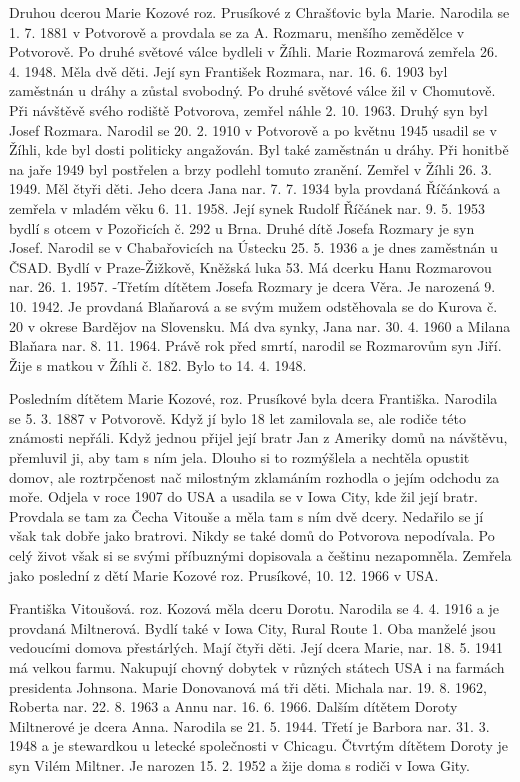 \documentclass[../dejiny-rodu-prusiku.tex]{subfiles}
\begin{document}
Druhou dcerou Marie Kozové roz. Prusíkové z Chrašťovic byla Marie. Narodila se 1. 7. 1881 v Potvorově a provda­la se za A. Rozmaru, menšího zemědělce v Potvorově. Po druhé světové válce bydleli v Žíhli. Marie Rozmarová zemřela 26. 4. 1948. Měla dvě děti. Její syn František Rozmara, nar. 16. 6. 1903 byl zaměstnán u dráhy a zůstal svobodný. Po druhé světové válce žil v Chomutově. Při návštěvě svého rodiště Potvorova, zemřel náhle 2. 10. 1963. Druhý syn byl Josef Rozmara. Narodil se 20. 2. 1910 v Potvorově a po květnu 1945 usadil se v Žíhli, kde byl dosti politicky angažován. Byl také zaměstnán u dráhy. Při honitbě na jaře 1949 byl postřelen a brzy podlehl tomuto zranění. Zemřel v Žíhli 26. 3. 1949. Měl čtyři děti. Jeho dcera Jana nar. 7. 7. 1934 byla provdaná Říčánková a zemřela v mladém věku 6. 11. 1958. Její synek Rudolf Říčánek nar. 9. 5. 1953 bydlí s otcem v Pozořicích č. 292 u Brna. Druhé dítě Josefa Rozmary je syn Josef. Narodil se v Chabařovicích na Ústecku 25. 5. 1936 a je dnes zaměstnán u ČSAD. Bydlí v Praze-Žižkově, Kněžská luka 53. Má dcerku Hanu Rozmarovou nar. 26. 1. 1957. -Třetím dítětem Josefa Rozmary je dcera Věra. Je narozená 9. 10. 1942. Je provdaná Blaňarová a se svým mužem odstěhovala se do Kurova č. 20 v okrese Bardějov na Slovensku. Má dva synky, Jana nar. 30. 4. 1960 a Milana Blaňara nar. 8. 11. 1964. Právě rok před smrtí, narodil se Rozmarovům syn Jiří. Žije s matkou v Žíhli č. 182. Bylo to 14. 4. 1948.

Posledním dítětem Marie Kozové, roz. Prusíkové byla dcera Františka. Narodila se 5. 3. 1887 v Potvorově. Když jí bylo 18 let zamilovala se, ale rodiče této známosti nepřáli. Když jednou přijel její bratr Jan z Ameriky domů na návštěvu, přemluvil ji, aby tam s ním jela. Dlouho si to rozmýšlela a nechtěla opustit domov, ale roztrpčenost nač milostným zklamáním roz­hodla o jejím odchodu za moře. Odjela v roce 1907 do USA a usadila se v Iowa City, kde žil její bratr. Provdala se tam za Čecha Vitouše a měla tam s ním dvě dcery. Nedařilo se jí však tak dobře jako bratrovi. Nikdy se také domů do Potvorova nepodívala. Po celý život však si se svými příbuznými dopisovala a češti­nu nezapomněla. Zemřela jako poslední z dětí Marie Kozové roz. Prusíkové, 10. 12. 1966 v USA.

Františka Vitoušová. roz. Kozová měla dceru Dorotu. Narodila se 4. 4. 1916 a je provdaná Miltnerová. Bydlí také v Iowa City, Rural Route 1. Oba manželé jsou vedoucími domova přestárlých. Mají čtyři děti. Její dcera Marie, nar. 18. 5. 1941 má velkou farmu. Nakupují chovný dobytek v různých státech USA i na farmách pre­sidenta Johnsona. Marie Donovanová má tři děti. Michala nar. 19. 8. 1962, Roberta nar. 22. 8. 1963 a Annu nar. 16. 6. 1966. Dalším dítětem Doroty Miltnerové je dcera Anna. Narodila se 21. 5. 1944. Třetí je Barbora nar. 31. 3. 1948 a je stewardkou u letecké společnosti v Chicagu. Čtvrtým dítětem Doroty je syn Vilém Miltner. Je narozen 15. 2. 1952 a žije doma s rodiči v Iowa Gity.
\end{document}
